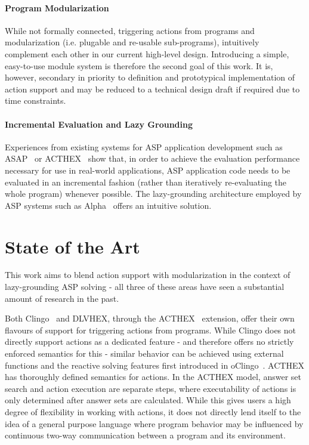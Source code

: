 \paragraph{Program Modularization} While not formally connected, triggering actions from programs and modularization (i.e. plugable and re-usable sub-programs), intuitively complement each other in our current high-level design. Introducing a simple, easy-to-use module system is therefore the second goal of this work. It is, however, secondary in priority to definition and prototypical implementation of action support and may be reduced to a technical design draft if required due to time constraints.

\paragraph{Incremental Evaluation and Lazy Grounding} Experiences from existing systems for ASP application development such as ASAP~\cite{aspetris} or ACTHEX~\cite{acthex} show that, in order to achieve the evaluation performance necessary for use in real-world applications, ASP application code needs to be evaluated in an incremental fashion (rather than iteratively re-evaluating the whole program) whenever possible. The lazy-grounding architecture employed by ASP systems such as Alpha~\cite{alpha} offers an intuitive solution.

\section{State of the Art}
\label{sec:state-of-the-art}
This work aims to blend action support with modularization in the context of lazy-grounding ASP solving - all three of these areas have seen a substantial amount of research in the past.

Both Clingo~\cite{clingo4} and DLVHEX, through the ACTHEX~\cite{acthex} extension, offer their own flavours of support for triggering actions from programs. While Clingo does not directly support actions as a dedicated feature - and therefore offers no strictly enforced semantics for this - similar behavior can be achieved using external functions and the reactive solving features first introduced in oClingo~\cite{oclingo}. ACTHEX has thoroughly defined semantics for actions. In the ACTHEX model, answer set search and action execution are separate steps, where executability of actions is only determined after answer sets are calculated. While this gives users a high degree of flexibility in working with actions, it does not directly lend itself to the idea of a general purpose language where program behavior may be influenced by continuous two-way communication between a program and its environment.

